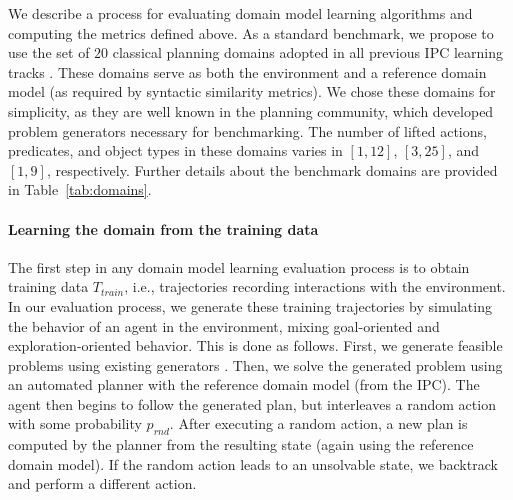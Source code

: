 \documentclass[letterpaper]{article} %
\newcommand{\T}{T}
\newcommand{\Ttrain}{\T_{train}}
\newif\ifaddcomments
\newcommand{\todo}[1]{\ifaddcomments{\textcolor{red}{[TODO: #1]}}\fi}
\newcommand{\roni}[1]{\ifaddcomments{\textcolor{red}{[Roni: #1]}}\fi}
\newcommand{\leo}[1]{\ifaddcomments{\textcolor{pink}{[Leonardo: #1]}}\fi}
\begin{document}





We describe a process for evaluating domain model learning algorithms 
and computing the metrics defined above. %
%
As a standard benchmark, we propose to use the set of $20$ classical planning domains adopted in all previous IPC learning tracks \citep{fern2011first, vallati20152014, taitler20242023}. 
These domains serve as both the environment and a reference domain model (as required by syntactic similarity metrics). 
We chose these domains for simplicity, as they are well known in the planning community, which developed problem generators necessary for benchmarking. 
The number of lifted actions, predicates, and object types in these domains varies in 
$[1, 12]$, $[3,25]$, and $[1, 9]$, respectively.
Further details about the benchmark domains are provided in Table~\ref{tab:domains}. 

%
\paragraph{Learning the domain from the training data} 
The first step in any domain model learning evaluation process is to obtain training data $\Ttrain$, i.e., trajectories recording interactions with the environment. 
In our evaluation process, we generate these training trajectories by simulating the behavior of an agent in the environment, mixing goal-oriented and exploration-oriented behavior. 
This is done as follows. 
First, we generate feasible problems using existing generators \citep{seipp-et-al-zenodo2022}. 
Then, we solve the generated problem using an automated planner with the reference domain model (from the IPC). 
The agent then begins to follow the generated plan, but interleaves a random action with some probability $p_{rnd}$.  
After executing a random action, a new plan is computed by the planner from the resulting state (again using the reference domain model). If the random action leads to an unsolvable state, we backtrack and perform a different action. 
\end{document}

